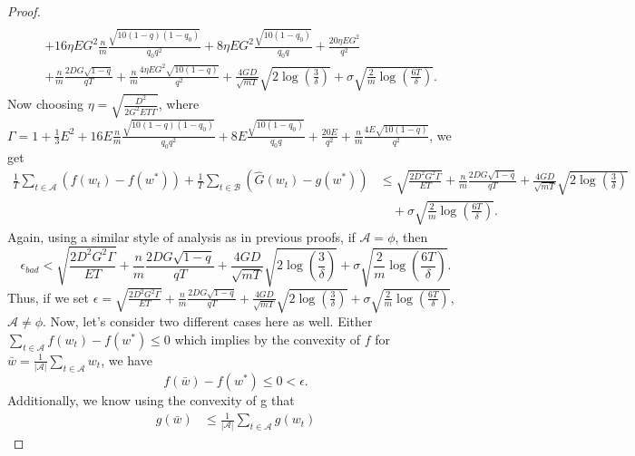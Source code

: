 \documentclass{article} %
\def\A{{\mathcal A}}
\def\B{{\mathcal B}}
\begin{document}
\begin{proof}
\begin{align*}
        \\
        &+ 16\eta EG^2\frac{n}{m}\frac{\sqrt{10(1-q) (1-q_0)}}{q_0q^2} + 8\eta EG^2\frac{\sqrt{10(1-q_0)}}{q_0q} + \frac{20 \eta EG^2}{ q^2}
        \\
        & +  \frac{n}{m}\frac{2 DG\sqrt{1-q}}{qT} +  \frac{n}{m}\frac{4\eta EG^2\sqrt{10(1-q)}}{ q^2} 
         + \frac{4GD}{\sqrt{mT}}\sqrt{2\log\left(\frac{3}{\delta}\right)} +  \sigma\sqrt{\frac{2}{m} \log\left(\frac{6T}{\delta}\right)}.
    \end{align*}
    Now choosing $\eta = \sqrt{\frac{D^2}{2G^2 E T \Gamma}}$, where $\Gamma = 1 + \frac{1}{3} E^2 + 16 E\frac{n}{m}\frac{\sqrt{10(1-q) (1-q_0)}}{q_0q^2} + 8 E\frac{\sqrt{10(1-q_0)}}{q_0q} + \frac{20 E}{ q^2} + \frac{n}{m}\frac{4 E\sqrt{10(1-q)}}{ q^2}$, we get
    \begin{equation*}
    \begin{aligned}
        \frac{1}{T}\sum_{t\in \A}(f(w_t) - f(w^*) ) + \frac{1}{T}\sum_{t\in \B}(\hat{G}(w_t) - g(w^*)) &\leq \sqrt{\frac{{2 D^2 G^2 \Gamma}}{{E T}}} + \frac{n}{m}\frac{2 DG\sqrt{1-q}}{qT}
        + \frac{4GD}{\sqrt{mT}}\sqrt{2\log\left(\frac{3}{\delta}\right)}
        \\
        &\quad +  \sigma\sqrt{\frac{2}{m} \log\left(\frac{6T}{\delta}\right)}.
    \end{aligned}
    \end{equation*}
    Again, using a similar style of analysis as in previous proofs, if $\A = \phi$, then
    $$\epsilon_{bad} < \sqrt{\frac{{2 D^2 G^2 \Gamma}}{{E T}}} + \frac{n}{m}\frac{2 DG\sqrt{1-q}}{qT}
    + \frac{4GD}{\sqrt{mT}}\sqrt{2\log\left(\frac{3}{\delta}\right)}
    +  \sigma\sqrt{\frac{2}{m} \log\left(\frac{6T}{\delta}\right)}.$$
    Thus, if we set $\epsilon = \sqrt{\frac{{2 D^2 G^2 \Gamma}}{{E T}}} + \frac{n}{m}\frac{2 DG\sqrt{1-q}}{qT}
    + \frac{4GD}{\sqrt{mT}}\sqrt{2\log\left(\frac{3}{\delta}\right)}
    +  \sigma\sqrt{\frac{2}{m} \log\left(\frac{6T}{\delta}\right)}$, $\A \neq \phi$.
    Now, let's consider two different cases here as well. Either $\sum_{t\in \A} f(w_t)-f(w^*) \leq 0$ which implies by the convexity of $f$ for $\bar{w} = \frac{1}{|\A|} \sum_{t\in \A} w_t$, we have
    \begin{equation}
    \label{eq:fedhbisgm_partial_objective_result1_1}
        f(\bar{w})-f(w^*) \leq 0 <\epsilon.
    \end{equation}
    Additionally, we know using the convexity of g that
    \begin{align*}
        g(\bar{w}) &\leq \frac{1}{|\A|} \sum_{t\in \A}g(w_t)

\end{align*}
\end{proof}
\end{document}
